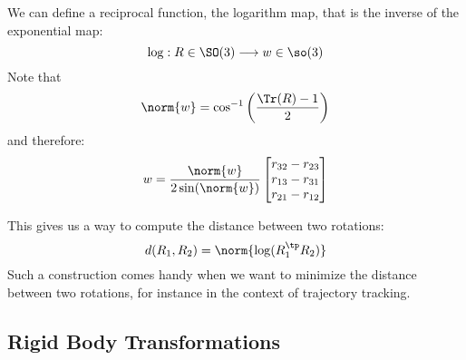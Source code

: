 We can define a reciprocal function, the logarithm map, that is the inverse of the exponential map:
\begin{equation*}
    \log:R\in\SO(3)\longrightarrow w\in\so(3)
\end{equation*}
Note that
\begin{equation*}
    \norm{w}=\cos^{-1}\left(\frac{\Tr(R)-1}{2}\right)
\end{equation*}
and therefore:
\begin{equation*}
    w=\frac{\norm{w}}{2\sin(\norm{w})}\begin{bmatrix}
        r_{32}-r_{23} \\
        r_{13}-r_{31} \\
        r_{21}-r_{12}
    \end{bmatrix}
\end{equation*}

This gives us a way to compute the distance between two rotations:
\begin{equation*}
    d(R_1, R_2) = \norm{\log(R_1^\tp R_2)}
\end{equation*}
Such a construction comes handy when we want to minimize the distance between two rotations, for instance in the context of trajectory tracking.

\subsection{Rigid Body Transformations}
